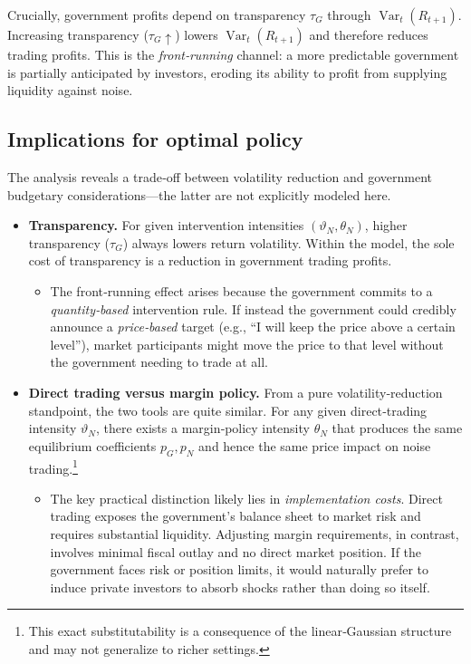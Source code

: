\documentclass[12pt]{article}
\begin{document}
Crucially, government profits depend on transparency \(\tau_G\) through \(\operatorname{Var}_t(R_{t+1})\).  
Increasing transparency (\(\tau_G \uparrow\)) lowers \(\operatorname{Var}_t(R_{t+1})\) and therefore reduces trading profits.  
This is the \emph{front‑running} channel: a more predictable government is partially anticipated by investors, eroding its ability to profit from supplying liquidity against noise.


\subsection{Implications for optimal policy}

The analysis reveals a trade‑off between volatility reduction and government budgetary considerations—the latter are not explicitly modeled here.

\begin{itemize}
    \item \textbf{Transparency.}  
    For given intervention intensities \((\vartheta_N,\theta_N)\), higher transparency (\(\tau_G\)) always lowers return volatility.  
    Within the model, the sole cost of transparency is a reduction in government trading profits.  

    \begin{itemize}
        \item The front‑running effect arises because the government commits to a \emph{quantity‑based} intervention rule. If instead the government could credibly announce a \emph{price‑based} target (e.g., ``I will keep the price above a certain level''), market participants might move the price to that level without the government needing to trade at all.
    \end{itemize}

    \item \textbf{Direct trading versus margin policy.}  
    From a pure volatility‑reduction standpoint, the two tools are quite similar.  
    For any given direct‑trading intensity \(\vartheta_N\), there exists a margin‑policy intensity \(\theta_N\) that produces the same equilibrium coefficients \(p_G, p_N\) and hence the same price impact on noise trading.\footnote{This exact substitutability is a consequence of the linear‑Gaussian structure and may not generalize to richer settings.}

    \begin{itemize}
        \item The key practical distinction likely lies in \emph{implementation costs}.  
    Direct trading exposes the government’s balance sheet to market risk and requires substantial liquidity.  
    Adjusting margin requirements, in contrast, involves minimal fiscal outlay and no direct market position.  
    If the government faces risk or position limits, it would naturally prefer to induce private investors to absorb shocks rather than doing so itself.
    \end{itemize}
\end{itemize}
\end{document}

